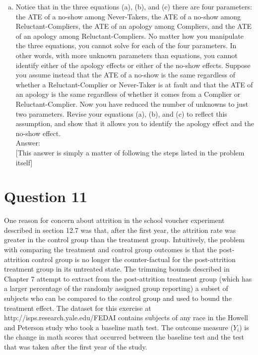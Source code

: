 \documentclass[11pt,notitlepage]{article}\usepackage[]{graphicx}\usepackage[]{color}
\begin{document}
\begin{enumerate}[a)]
\item Notice that in the three equations (a), (b), and (c) there are four parameters: the ATE of a no-show among Never-Takers, the ATE of a no-show among Reluctant-Compliers, the ATE of an apology among Compliers, and the ATE of an apology among Reluctant-Compliers. No matter how you manipulate the three equations, you cannot solve for each of the four parameters. In other words, with more unknown parameters than equations, you cannot identify either of the apology effects or either of the no-show effects. Suppose you assume instead that the ATE of a no-show is the same regardless of whether a Reluctant-Complier or Never-Taker is at fault and that the ATE of an apology is the same regardless of whether it comes from a Complier or Reluctant-Complier. Now you have reduced the number of unknowns to just two parameters. Revise your equations (a), (b), and (c) to reflect this assumption, and show that it allows you to identify the apology effect and the no-show effect.\\
Answer:\\

[This answer is simply a matter of following the steps listed in the problem itself]




\end{enumerate}


\section*{Question 11}
One reason for concern about attrition in the school voucher experiment described in section 12.7 was that, after the first year, the attrition rate was greater in the control group than the treatment group. Intuitively, the problem with comparing the treatment and control group outcomes is that the post-attrition control group is no longer the counter-factual for the post-attrition treatment group in its untreated state. The trimming bounds described in Chapter 7 attempt to extract from the post-attrition treatment group (which has a larger percentage of the randomly assigned group reporting) a subset of subjects who can be compared to the control group and used to bound the treatment effect. The dataset for this exercise at http://isps.research.yale.edu/FEDAI contains subjects of any race in the Howell and Peterson study who took a baseline math test. The outcome measure ($Y_i$) is the change in math scores that occurred between the baseline test and the test that was taken after the first year of the study.
\end{document}
